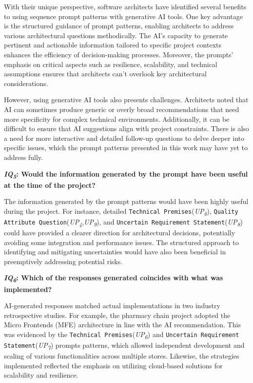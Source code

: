 
With their unique perspective, software architects have identified several benefits to using sequence prompt patterns with generative AI tools. One key advantage is the structured guidance of prompt patterns, enabling architects to address various architectural questions methodically. The AI's capacity to generate pertinent and actionable information tailored to specific project contexts enhances the efficiency of decision-making processes. Moreover, the prompts' emphasis on critical aspects such as resilience, scalability, and technical assumptions ensures that architects can't overlook key architectural considerations.

However, using generative AI tools also presents challenges. Architects noted that AI can sometimes produce generic or overly broad recommendations that need more specificity for complex technical environments. Additionally, it can be difficult to ensure that AI suggestions align with project constraints. There is also a need for more interactive and detailed follow-up questions to delve deeper into specific issues, which the prompt patterns presented in this work may have yet to address fully.


\textbf{\textit{IQ\textsubscript{5}}: Would the information generated by the prompt have been useful at the time of the project?}

The information generated by the prompt patterns would have been highly useful during the project. For instance, detailed \texttt{Technical Premises}(\textit{UP\textsubscript{6}}), \texttt{Quality Attribute Question}(\textit{UP\textsubscript{4}},\textit{UP\textsubscript{9}}), and \texttt{Uncertain Requirement Statement}(\textit{UP\textsubscript{8}}) could have provided a clearer direction for architectural decisions, potentially avoiding some integration and performance issues. The structured approach to identifying and mitigating uncertainties would have also been beneficial in preemptively addressing potential risks.

\textbf{\textit{IQ\textsubscript{6}}: Which of the responses generated coincides with what was implemented?}

AI-generated responses matched actual implementations in two industry retrospective studies. For example, the pharmacy chain project adopted the Micro Frontends (MFE) architecture in line with the AI recommendation. This was evidenced by the \texttt{Technical Premises}(\textit{UP\textsubscript{6}}) and \texttt{Uncertain Requirement Statement}(\textit{UP\textsubscript{7}}) prompts patterns, which allowed independent development and scaling of various functionalities across multiple stores. Likewise, the strategies implemented reflected the emphasis on utilizing cloud-based solutions for scalability and resilience.

